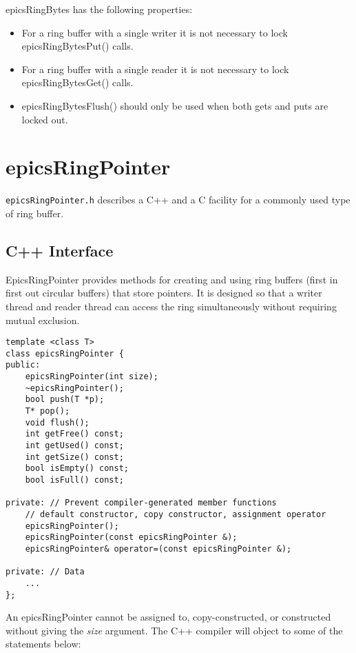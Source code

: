 epicsRingBytes has the following properties:

\begin{itemize}\item For a ring buffer with a single writer it is not necessary to lock epicsRingBytesPut() calls.

\item For a ring buffer with a single reader it is not necessary to lock epicsRingBytesGet() calls.

\item epicsRingBytesFlush() should only be used when both gets and puts are locked out.

\end{itemize}\section{epicsRingPointer}

\verb|epicsRingPointer.h| describes a C++ and a C facility for a commonly used type of ring buffer.

\subsection{C++ Interface}

EpicsRingPointer provides methods for creating and using ring buffers (first in first out circular buffers) that store 
pointers. It is designed so that a writer thread and reader thread can access the ring simultaneously without requiring 
mutual exclusion.

\begin{verbatim}template <class T>
class epicsRingPointer {
public:
    epicsRingPointer(int size);
    ~epicsRingPointer();
    bool push(T *p);
    T* pop();
    void flush();
    int getFree() const;
    int getUsed() const;
    int getSize() const;
    bool isEmpty() const;
    bool isFull() const;

private: // Prevent compiler-generated member functions
    // default constructor, copy constructor, assignment operator
    epicsRingPointer();
    epicsRingPointer(const epicsRingPointer &);
    epicsRingPointer& operator=(const epicsRingPointer &);

private: // Data
    ...
};
\end{verbatim}An epicsRingPointer cannot be assigned to, copy-constructed, or constructed without giving the \emph{size} argument. The C++ 
compiler will object to some of the statements below:

